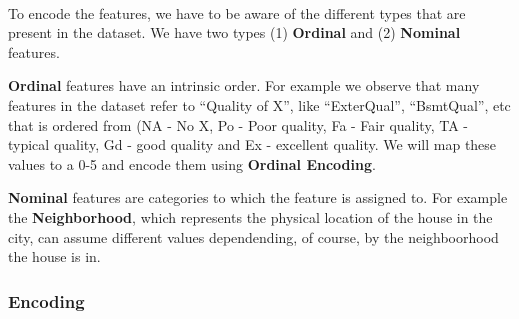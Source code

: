 \documentclass[11pt]{article}
\begin{document}
    \begin{center}
    \end{center}
    { \hspace*{\fill} \\}
    
    To encode the features, we have to be aware of the different types that
are present in the dataset. We have two types (1) \textbf{Ordinal} and
(2) \textbf{Nominal} features.

\textbf{Ordinal} features have an intrinsic order. For example we
observe that many features in the dataset refer to ``Quality of X'',
like ``ExterQual'', ``BsmtQual'', etc that is ordered from (NA - No X,
Po - Poor quality, Fa - Fair quality, TA - typical quality, Gd - good
quality and Ex - excellent quality. We will map these values to a 0-5
and encode them using \textbf{Ordinal Encoding}.

\textbf{Nominal} features are categories to which the feature is
assigned to. For example the \textbf{Neighborhood}, which represents the
physical location of the house in the city, can assume different values
dependending, of course, by the neighboorhood the house is in.

    \subsubsection{Encoding}\label{encoding}
\end{document}
